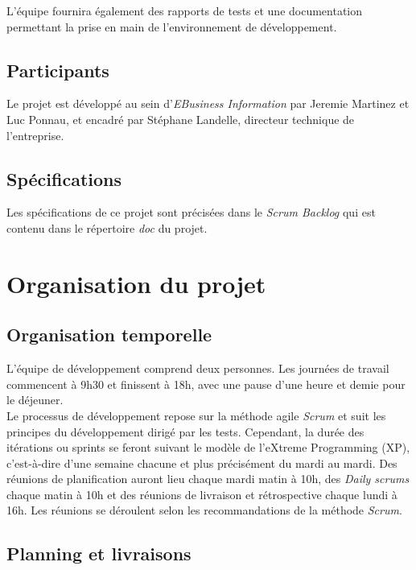 \documentclass[11pt]{article}
\begin{document}
L'équipe fournira également des rapports de tests et une documentation permettant la prise en main de l'environnement de développement.

\subsection{Participants}

Le projet est développé au sein d'\emph{EBusiness Information} par
Jeremie Martinez et Luc Ponnau, et encadré par Stéphane Landelle, directeur
technique de l'entreprise. 

\subsection{Spécifications}

Les spécifications de ce projet sont précisées dans le \emph{Scrum Backlog} qui est contenu dans le répertoire \emph{doc} du projet.

\section{Organisation du projet}

\subsection{Organisation temporelle}

L'équipe de développement comprend deux personnes. Les journées de travail
commencent à 9h30 et finissent à 18h, avec une pause d'une heure et demie
pour le déjeuner.\\

Le processus de développement repose sur la méthode agile \emph{Scrum} et suit les
principes du développement dirigé par les tests. Cependant, la durée des itérations ou sprints se feront suivant le modèle de l'eXtreme Programming (XP), c'est-à-dire d'une semaine chacune et plus précisément du mardi au mardi. Des réunions de planification auront lieu
chaque mardi matin à 10h, des \emph{Daily scrums} chaque matin à 10h et des
réunions de livraison et rétrospective chaque lundi à 16h. Les réunions
se déroulent selon les recommandations de la méthode \emph{Scrum}.\\

\subsection{Planning et livraisons}
\end{document}
